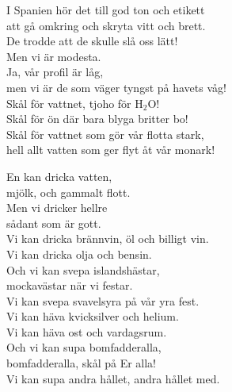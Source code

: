 \documentclass[a6paper, 10pt, twoside]{article}
\begin{document}
\noindent
{}
\small
\begin{center}
\end{center}
\begin{lyrics}
I Spanien hör det till god ton och etikett\\
att gå omkring och skryta vitt och brett.\\
De trodde att de skulle slå oss lätt!
\vspace{5pt}\\
Men vi är modesta.\\
Ja, vår profil är låg,\\
men vi är de som väger tyngst på havets våg!
\vspace{5pt}\\
Skål för vattnet, tjoho för H$_2$O!\\
Skål för ön där bara blyga britter bo!\\
Skål för vattnet som gör vår flotta stark,\\
hell allt vatten som ger flyt åt vår monark!
\end{lyrics}

\noindent
\begin{center}
\end{center}
\begin{lyrics}
En kan dricka vatten, \\
mjölk, och gammalt flott.\\
Men vi dricker hellre\\
sådant som är gott.
\vspace{5pt}\\
Vi kan dricka brännvin, öl och billigt vin.\\
Vi kan dricka olja och bensin.
\vspace{5pt}\\
Och vi kan svepa islandshästar,\\
mockavästar när vi festar.\\
Vi kan svepa svavelsyra på vår yra fest.
\vspace{5pt}\\
Vi kan häva kvicksilver och helium.\\
Vi kan häva ost och vardagsrum.
\vspace{5pt}\\
Och vi kan supa bomfadderalla,\\
bomfadderalla, skål på Er alla!\\
Vi kan supa andra hållet, andra hållet med. 
\end{lyrics}
\end{document}
